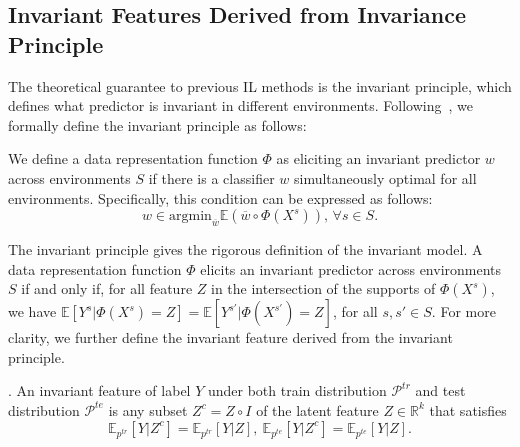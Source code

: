 \subsection{Invariant Features Derived from Invariance Principle}
\label{subsec: problems of ip}
The theoretical guarantee to previous IL methods is the invariant principle, which defines what predictor is invariant in different environments.
Following~\cite{irmv1}, we formally define the invariant principle as follows:  
\begin{definition}
    We define a data representation function $\Phi$ as eliciting an invariant predictor $w$ across environments $S$ if there is a classifier $w$ simultaneously optimal for all environments. Specifically, this condition can be expressed as follows:
    \begin{equation}
        w \in \text{argmin}_{\overline{w}} \mathbb{E}(\overline{w} \circ \Phi(X^s)) , \, \forall s \in S. 
    \label{eq: invariant principle}
    \end{equation}
\end{definition}
The invariant principle gives the rigorous definition of the invariant model.
A data representation function $\Phi$ elicits an invariant predictor across environments $S$ if and only if, for all feature $Z$ in the intersection of the supports of $\Phi(X^s)$, we have $\mathbb{E}[Y^s|\Phi(X^s) = Z] = \mathbb{E}[Y^{s'}|\Phi(X^{s'}) = Z]$, for all $s, s' \in S$.
For more clarity, we further define the invariant feature derived from the invariant principle.






\begin{definition}
. An invariant feature of label $Y$ under both train distribution $\mathcal{P}^{tr}$ and test distribution $\mathcal{P}^{te}$ is any subset $Z^c = Z \circ I$ of the latent feature $Z \in \mathbb{R}^k$ that satisfies 
\begin{equation}
  \mathbb{E}_{p^{tr}}[Y|Z^c]=\mathbb{E}_{p^{tr}}[Y|Z], \ \mathbb{E}_{p^{te}}[Y|Z^c]=\mathbb{E}_{p^{te}}[Y|Z].  
\end{equation}
\end{definition}

